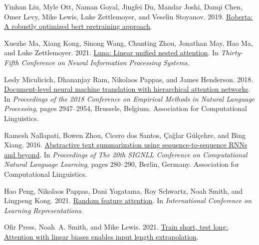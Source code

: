 \documentclass[11pt]{article}
\begin{document}
\begin{thebibliography}{43}
Yinhan Liu, Myle Ott, Naman Goyal, Jingfei Du, Mandar Joshi, Danqi Chen, Omer
  Levy, Mike Lewis, Luke Zettlemoyer, and Veselin Stoyanov. 2019.
\newblock \href {http://arxiv.org/abs/1907.11692} {Roberta: A robustly
  optimized bert pretraining approach}.

Xuezhe Ma, Xiang Kong, Sinong Wang, Chunting Zhou, Jonathan May, Hao Ma, and
  Luke Zettlemoyer. 2021.
\newblock \href {https://openreview.net/forum?id=GWRkOYr4jxQ} {Luna: Linear
  unified nested attention}.
\newblock In \emph{Thirty-Fifth Conference on Neural Information Processing
  Systems}.

Lesly Miculicich, Dhananjay Ram, Nikolaos Pappas, and James Henderson. 2018.
\newblock \href {https://www.aclweb.org/anthology/D18-1325} {Document-level
  neural machine translation with hierarchical attention networks}.
\newblock In \emph{Proceedings of the 2018 Conference on Empirical Methods in
  Natural Language Processing}, pages 2947--2954, Brussels, Belgium.
  Association for Computational Linguistics.

Ramesh Nallapati, Bowen Zhou, Cicero dos Santos, {\c{C}}a{\u{g}}lar
  G\.{u}l{\c{c}}ehre, and Bing Xiang. 2016.
\newblock \href {https://doi.org/10.18653/v1/K16-1028} {Abstractive text
  summarization using sequence-to-sequence {RNN}s and beyond}.
\newblock In \emph{Proceedings of The 20th {SIGNLL} Conference on Computational
  Natural Language Learning}, pages 280--290, Berlin, Germany. Association for
  Computational Linguistics.

Hao Peng, Nikolaos Pappas, Dani Yogatama, Roy Schwartz, Noah Smith, and
  Lingpeng Kong. 2021.
\newblock \href {https://openreview.net/forum?id=QtTKTdVrFBB} {Random feature
  attention}.
\newblock In \emph{International Conference on Learning Representations}.

Ofir Press, Noah~A. Smith, and Mike Lewis. 2021.
\newblock \href {http://arxiv.org/abs/2108.12409} {Train short, test long:
  Attention with linear biases enables input length extrapolation}.


\end{thebibliography}
\end{document}
